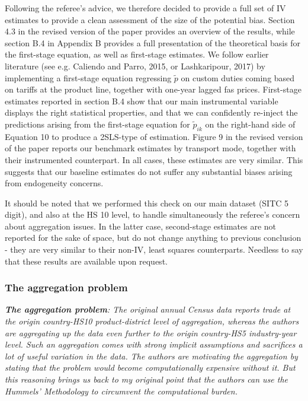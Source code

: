 \documentclass[a4paper,11pt]{article}
\begin{document}
Following the referee's advice, we therefore decided to provide a full set of IV estimates to provide a clean assessment of the size of the potential bias. Section 4.3 in the revised version of the paper provides an overview of the results, while section B.4 in Appendix B provides a full presentation of the theoretical basis for the first-stage equation, as well as first-stage estimates. We follow earlier literature (see e.g. Caliendo and Parro, 2015, or Lashkaripour, 2017) by implementing a first-stage equation regressing $\widetilde{p}$ on custom duties coming based on tariffs at the product line, together with one-year lagged fas prices. First-stage estimates reported in section B.4 show that our main instrumental variable displays the right statistical properties, and that we can confidently re-inject the predictions arising from the first-stage equation for $\widetilde{p}_{ik}$ on the right-hand side of Equation 10 to produce a 2SLS-type of estimation. Figure 9 in the revised version of the paper reports our benchmark estimates by transport mode, together with their instrumented counterpart. In all cases, these estimates are very similar. This suggests that our baseline estimates do not suffer any substantial biases arising from endogeneity concerns.

It should be noted that we performed this check on our main dataset (SITC 5 digit), and also at the HS 10 level, to handle simultaneously the referee's concern about aggregation issues. In the latter case, second-stage estimates are not reported for the sake of space, but do not change anything to previous conclusion - they are very similar to their non-IV, least squares counterparts. Needless to say that these results are available upon request.


\subsubsection{The aggregation problem}

\textit{\textbf{The aggregation problem}: The original annual Census data reports
trade at the origin country-HS10 product-district level of aggregation,
whereas the authors are aggregating up the data even further to the origin
country-HS5 industry-year level. Such an aggregation comes with strong implicit assumptions and sacrifices a lot of useful variation in the data.
The authors are motivating the aggregation by stating that the problem
would become computationally expensive without it. But this reasoning
brings us back to my original point that the authors can use the Hummels'
Methodology to circumvent the computational burden.}
\end{document}
